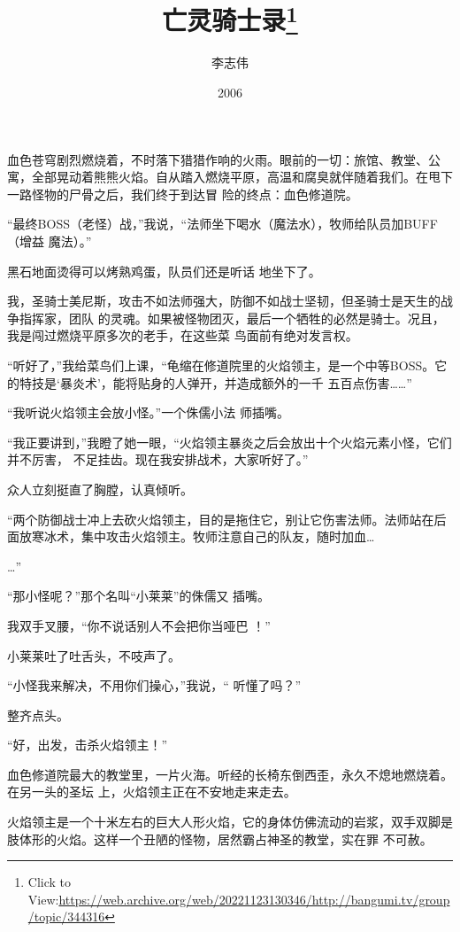 \documentclass{article}
\title{亡灵骑士录\footnote{Click to View:\url{https://web.archive.org/web/20221123130346/http://bangumi.tv/group/topic/344316}}}
\author{李志伟}
\date{2006}
\begin{document}

\maketitle


\Large

﻿血色苍穹剧烈燃烧着，不时落下猎猎作响的火雨。眼前的一切：旅馆、教堂、公寓，全部晃动着熊熊火焰。自从踏入燃烧平原，高温和腐臭就伴随着我们。在甩下一路怪物的尸骨之后，我们终于到达冒
险的终点：血色修道院。 

“最终BOSS（老怪）战，”我说，“法师坐下喝水（魔法水），牧师给队员加BUFF（增益
魔法）。” 

黑石地面烫得可以烤熟鸡蛋，队员们还是听话
地坐下了。 

我，圣骑士美尼斯，攻击不如法师强大，防御不如战士坚韧，但圣骑士是天生的战争指挥家，团队
\newpage
的灵魂。如果被怪物团灭，最后一个牺牲的必然是骑士。况且，我是闯过燃烧平原多次的老手，在这些菜
鸟面前有绝对发言权。 

“听好了，”我给菜鸟们上课，“龟缩在修道院里的火焰领主，是一个中等BOSS。它的特技是‘暴炎术’，能将贴身的人弹开，并造成额外的一千
五百点伤害……” 

“我听说火焰领主会放小怪。”一个侏儒小法
师插嘴。 

“我正要讲到，”我瞪了她一眼，“火焰领主暴炎之后会放出十个火焰元素小怪，它们并不厉害，
不足挂齿。现在我安排战术，大家听好了。” 


众人立刻挺直了胸膛，认真倾听。 

“两个防御战士冲上去砍火焰领主，目的是拖住它，别让它伤害法师。法师站在后面放寒冰术，集中攻击火焰领主。牧师注意自己的队友，随时加血…
\newpage

…” 

“那小怪呢？”那个名叫“小莱莱”的侏儒又
插嘴。 

我双手叉腰，“你不说话别人不会把你当哑巴
！” 


小莱莱吐了吐舌头，不吱声了。 

“小怪我来解决，不用你们操心，”我说，“
听懂了吗？” 


整齐点头。 


“好，出发，击杀火焰领主！” 

血色修道院最大的教堂里，一片火海。听经的长椅东倒西歪，永久不熄地燃烧着。在另一头的圣坛
上，火焰领主正在不安地走来走去。 

\newpage

火焰领主是一个十米左右的巨大人形火焰，它的身体仿佛流动的岩浆，双手双脚是肢体形的火焰。这样一个丑陋的怪物，居然霸占神圣的教堂，实在罪
不可赦。 
\end{document}
